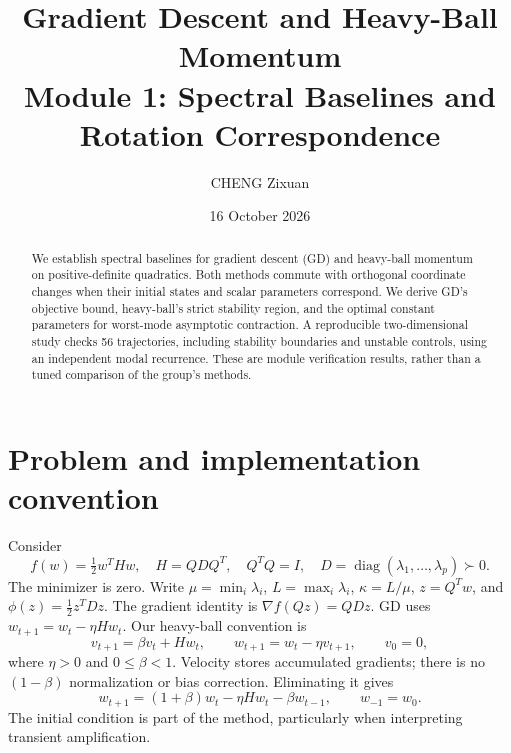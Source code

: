 \documentclass[11pt,a4paper]{article}
\title{Gradient Descent and Heavy-Ball Momentum\\
\large Module 1: Spectral Baselines and Rotation Correspondence}
\author{CHENG Zixuan}
\date{16 October 2026}
\begin{document}
\maketitle

\begin{abstract}
We establish spectral baselines for gradient descent (GD) and heavy-ball
momentum on positive-definite quadratics. Both methods commute with orthogonal
coordinate changes when their initial states and scalar parameters correspond.
We derive GD's objective bound, heavy-ball's strict stability region, and the
optimal constant parameters for worst-mode asymptotic contraction. A reproducible
two-dimensional study checks 56 trajectories, including stability boundaries
and unstable controls, using an independent modal recurrence. These are module
verification results, rather than a tuned comparison of the group's methods.
\end{abstract}

\section{Problem and implementation convention}
Consider
\[
 f(w)=\tfrac12w^THw,\quad H=QDQ^T,\quad Q^TQ=I,\quad
 D=\operatorname{diag}(\lambda_1,\ldots,\lambda_p)\succ0.
\]
The minimizer is zero. Write $\mu=\min_i\lambda_i$, $L=\max_i\lambda_i$,
$\kappa=L/\mu$, $z=Q^Tw$, and $\phi(z)=\tfrac12z^TDz$.
The gradient identity is $\nabla f(Qz)=QDz$.
GD uses $w_{t+1}=w_t-\eta Hw_t$. Our heavy-ball convention is
\begin{equation}
 v_{t+1}=\beta v_t+Hw_t,\qquad
 w_{t+1}=w_t-\eta v_{t+1},\qquad v_0=0,
 \label{eq:hb}
\end{equation}
where $\eta>0$ and $0\le\beta<1$. Velocity stores accumulated gradients;
there is no $(1-\beta)$ normalization or bias correction. Eliminating it gives
\begin{equation}
 w_{t+1}=(1+\beta)w_t-\eta Hw_t-\beta w_{t-1},\qquad w_{-1}=w_0.
 \label{eq:position}
\end{equation}
The initial condition is part of the method, particularly when interpreting
transient amplification.
\end{document}
